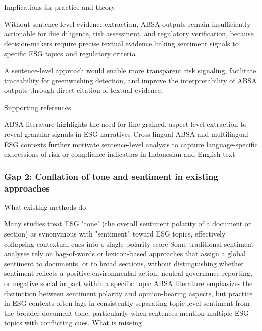 Implications for practice and theory

Without sentence-level evidence extraction, ABSA outputs remain insufficiently actionable for due diligence, risk assessment, and regulatory verification, because decision-makers require precise textual evidence linking sentiment signals to specific ESG topics and regulatory criteria \cite{10.1002/csr.70089,10.1108/mf-01-2023-0020,10.1111/eufm.12509}

A sentence-level approach would enable more transparent risk signaling, facilitate traceability for greenwashing detection, and improve the interpretability of ABSA outputs through direct citation of textual evidence.

Supporting references

ABSA literature highlights the need for fine-grained, aspect-level extraction to reveal granular signals in ESG narratives \cite{10.1002/csr.70089,10.3390/math12193119,10.2139/ssrn.3738629,10.1111/eufm.12509}
Cross-lingual ABSA and multilingual ESG contexts further motivate sentence-level analysis to capture language-specific expressions of risk or compliance indicators in Indonesian and English text \cite{10.1016/j.inffus.2025.103073,10.1111/eufm.12509,10.48550/arxiv.2511.00024}

\subsubsection{Gap 2: Conflation of tone and sentiment in existing approaches}
What existing methods do

Many studies treat ESG "tone" (the overall sentiment polarity of a document or section) as synonymous with "sentiment" toward ESG topics, effectively collapsing contextual cues into a single polarity score \cite{10.1002/csr.70089,10.69593/ajbais.v4i04.130,10.1108/mf-01-2023-0020}
Some traditional sentiment analyses rely on bag-of-words or lexicon-based approaches that assign a global sentiment to documents, or to broad sections, without distinguishing whether sentiment reflects a positive environmental action, neutral governance reporting, or negative social impact within a specific topic \cite{10.3390/su14159165,10.1111/eufm.12509}
ABSA literature emphasizes the distinction between sentiment polarity and opinion-bearing aspects, but practice in ESG contexts often lags in consistently separating topic-level sentiment from the broader document tone, particularly when sentences mention multiple ESG topics with conflicting cues.
What is missing

